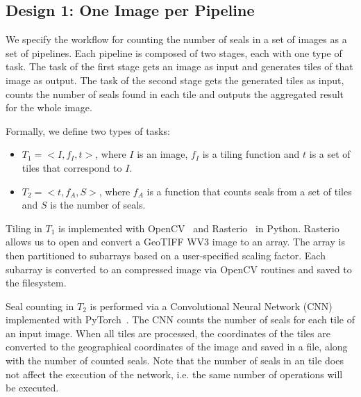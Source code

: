 \subsection{Design 1: One Image per Pipeline}
\label{ssec:approach1}\label{des1}



We specify the workflow for counting the number of seals in a set of images as a set of pipelines.
Each pipeline is composed of two stages, each with one type of task.
The task of the first stage gets an image as input and generates tiles of that image as output.
The task of the second stage gets the generated tiles as input, counts the number of seals found in each tile and outputs the aggregated result for the whole image.

Formally, we define two types of tasks:
\begin{itemize}
    \item $T_{1} = <I, f_{I}, t>$, where $I$ is an image, $f_{I}$ is a tiling function and $t$ is a set of tiles that correspond to $I$.
    \item $T_{2} = <t, f_{A}, S>$, where $f_{A}$ is a function that counts seals from a set of tiles and $S$ is the number of seals.
\end{itemize}


Tiling in $T_{1}$ is implemented with OpenCV~\cite{bradski2000opencv} and Rasterio~\cite{gillies2013rasterio} in Python.
Rasterio allows us to open and convert a GeoTIFF WV3 image to an array.
The array is then partitioned to sub\-arrays based on a user-specified scaling factor.
Each sub\-array is converted to an compressed image via OpenCV routines and saved to the filesystem.

Seal counting in $T_{2}$ is performed via a Convolutional Neural Network (CNN) implemented with PyTorch~\cite{paszke2017automatic}.
The CNN counts the number of seals for each tile of an input image.
When all tiles are processed, the coordinates of the tiles are converted to the geographical coordinates of the image and saved in a file, along with the number of counted seals.
Note that the number of seals in an tile does not affect the execution of the network, i.e. the same number of operations will be executed.

